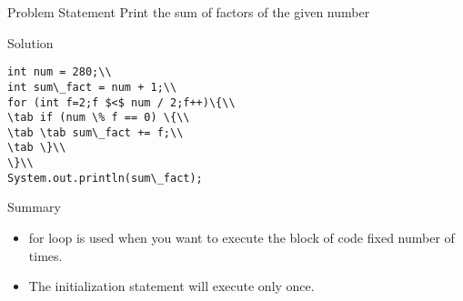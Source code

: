 \documentclass[aspectratio=169,14pt,usenames,dvipsnames]{beamer}
\newcommand\tab[1][1cm]{\hspace*{#1}}
\begin{document}
\begin{frame}{Problem Statement}
Print the sum of factors of the given number
\end{frame}

\begin{frame}{Solution}
\begin{lstlisting}
int num = 280;\\
int sum\_fact = num + 1;\\
for (int f=2;f $<$ num / 2;f++)\{\\
\tab if (num \% f == 0) \{\\
\tab \tab sum\_fact += f;\\
\tab \}\\
\}\\
System.out.println(sum\_fact);
\end{lstlisting}
\end{frame}


\begin{frame}{Summary}
\begin{itemize}
    \item for loop is used when you want to execute
the block of code fixed number of times.
\item The initialization statement will execute
only once.
\end{itemize}
\end{frame}
\end{document}

